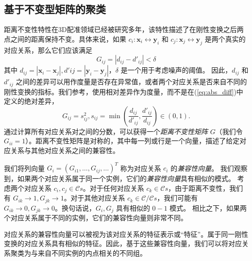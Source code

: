 \subsection{基于不变型矩阵的聚类}
\label{subsec:Distance-Consistency-Graph}
距离不变性特性在3D配准领域已经被研究多年\cite{yang2020teaser, shi2021robin,leordeanu2005spectral}，该特性描述了在刚性变换之后两点之间的距离保持不变。具体来说，如果 $c_i :\mathbf{x}_i \leftrightarrow \mathbf{y}_i$ 和 $c_j : \mathbf{x}_j \leftrightarrow \mathbf{y}_j$ 是两个真实的对应关系，那么它们应该满足
%
\begin{equation}
G_{ij}=|d_{ij} - d'_{ij} | < \delta
\label{eq:abs_diff}
\end{equation}
其中 $d_{ij} = |\mathbf{x}_i-\mathbf{x}_j|, d'{ij}=|\mathbf{y}_i -\mathbf{y}_j|$，$\delta $ 是一个用于考虑噪声的阈值。
因此，$d_{ij}$ 和 $d'_{ij}$ 之间的差异可以用作度量是否存在异常值，或者两个对应关系是否来自不同的刚性变换的指标。我们参考\cite{matrix}，使用相对差异作为度量，而不是在(\ref{eq:abs_diff})中定义的绝对差异，
\begin{equation}
G_{ij} = s_{ij}^2, s_{ij} = \min( \frac{d_{ij}}{d'_{ij}}, \frac{d'_{ij}}{d_{ij}}) \in (0, 1).
\end{equation}
通过计算所有对应关系对之间的分数，可以获得一个\emph{距离不变性矩阵} $G$（我们令 $G_{ii} = 1$）。距离不变性矩阵是对称的，其中每一列或行是一个向量，描述了给定对应关系与其他对应关系之间的兼容性\cite{reviewof3dourlierremovingjiaqiYang}。

我们将列向量 $G_i = (G_{i1}, \ldots , G_{ij}, \ldots)^T$ 称为对应关系 $c_i$ 的\emph{兼容性向量}。
我们观察到，如果两个对应关系属于同一个实例，它们的\emph{兼容性向量}具有相似的模式。
考虑两个对应关系 $c_i, c_j \in \mathcal{C}s$。对于任何对应关系 $c_k \in \mathcal{C}s$，由于距离不变性，我们有 $G_{ik} \rightarrow 1, G_{jk} \rightarrow 1$。对于其他对应关系 $c_k \in \mathcal{C}/\mathcal{C}s$，我们可能有 $G_{ik} \rightarrow 0, G_{jk} \rightarrow 0$。换句话说，$G_i,G_j$ 具有相似的 $0-1$ 模式。
相比之下，如果两个对应关系属于不同的实例，它们的兼容性向量则非常不同。

对应关系的兼容性向量可以被视为该对应关系的特征表示或“特征”。属于同一刚性变换的对应关系具有相似的特征。因此，基于这些兼容性向量，我们可以将对应关系聚类为与来自不同实例的内点相关的不同组。

